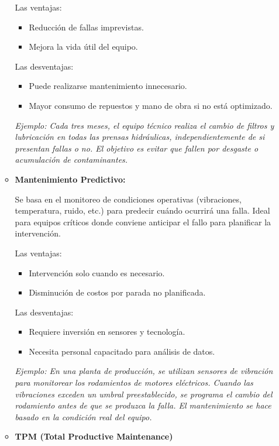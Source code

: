 \documentclass[a4paper,oneside,11pt]{article}
\begin{document}
\begin{enumerate}
\begin{itemize}
        Las ventajas:
        \begin{itemize}
            \item Reducción de fallas imprevistas.
            \item Mejora la vida útil del equipo.
        \end{itemize}
        Las desventajas:
        \begin{itemize}
            \item Puede realizarse mantenimiento innecesario.
            \item Mayor consumo de repuestos y mano de obra si no está optimizado.
        \end{itemize}

        \textit{Ejemplo: Cada tres meses, el equipo técnico realiza el cambio de filtros y lubricación en todas las prensas hidráulicas, independientemente de si presentan fallas o no. El objetivo es evitar que fallen por desgaste o acumulación de contaminantes.}

        \item \textbf{Mantenimiento Predictivo:}

        Se basa en el monitoreo de condiciones operativas (vibraciones, temperatura, ruido, etc.) para predecir cuándo ocurrirá una falla. Ideal para equipos críticos donde conviene anticipar el fallo para planificar la intervención.

        Las ventajas:
        \begin{itemize}
            \item Intervención solo cuando es necesario.
            \item Disminución de costos por parada no planificada.
        \end{itemize}
        Las desventajas:
        \begin{itemize}
            \item Requiere inversión en sensores y tecnología.
            \item Necesita personal capacitado para análisis de datos.
        \end{itemize}

        \textit{Ejemplo: En una planta de producción, se utilizan sensores de vibración para monitorear los rodamientos de motores eléctricos. Cuando las vibraciones exceden un umbral preestablecido, se programa el cambio del rodamiento antes de que se produzca la falla. El mantenimiento se hace basado en la condición real del equipo.}

        \item \textbf{TPM (Total Productive Maintenance)}


\end{itemize}
\end{enumerate}
\end{document}

